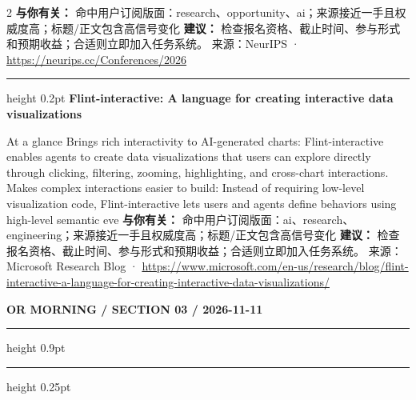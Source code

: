 \documentclass[10.5pt]{ctexart}
\begin{document}
\begin{multicols}{2}
\textbf{与你有关：} 命中用户订阅版面：research、opportunity、ai；来源接近一手且权威度高；标题/正文包含高信号变化
\textbf{建议：} 检查报名资格、截止时间、参与形式和预期收益；合适则立即加入任务系统。
{\footnotesize\color{ormuted} 来源：NeurIPS · \url{https://neurips.cc/Conferences/2026}}
\vspace{2mm}
\hrule height 0.2pt
\vspace{2mm}
{\large\bfseries Flint-interactive: A language for creating interactive data visualizations}\par
At a glance Brings rich interactivity to AI-generated charts: Flint-interactive enables agents to create data visualizations that users can explore directly through clicking, filtering, zooming, highlighting, and cross-chart interactions. Makes complex interactions easier to build: Instead of requiring low-level visualization code, Flint-interactive lets users and agents define behaviors using high-level semantic eve
\textbf{与你有关：} 命中用户订阅版面：ai、research、engineering；来源接近一手且权威度高；标题/正文包含高信号变化
\textbf{建议：} 检查报名资格、截止时间、参与形式和预期收益；合适则立即加入任务系统。
{\footnotesize\color{ormuted} 来源：Microsoft Research Blog · \url{https://www.microsoft.com/en-us/research/blog/flint-interactive-a-language-for-creating-interactive-data-visualizations/}}
\end{multicols}
\newpage
{\small\bfseries OR MORNING / SECTION 03 / 2026-11-11}
\vspace{2mm}
\hrule height 0.9pt
\vspace{1.5mm}
\hrule height 0.25pt
\vspace{4mm}
\end{document}
